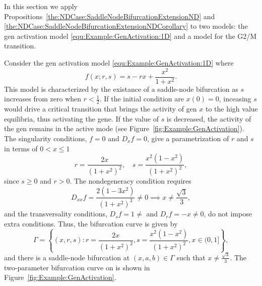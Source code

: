 \documentclass[12pt]{article}
\begin{document}
In this section we apply Propositions~\ref{the:NDCase:SaddleNodeBifurcationExtensionND} and \ref{the:NDCase:SaddleNodeBifurcationExtensionNDCorollary} to two models: the gen activation model \eqref{equ:Example:GenActivation:1D} and a model for the G2/M transition.


Consider the gen activation model \eqref{equ:Example:GenActivation:1D} where 
\[f(x;r,s)=s-rx+\frac{x^{2}}{1+x^{2}}.\]
This model is characterized by the existance of a saddle-node bifurcation as $s$ increases from zero when $r<\tfrac{1}{2}$. If the initial condition are $x(0)=0$, inceasing $s$ would drive a critical transition that brings the activity of gen $x$ to the high value equilibria, thus activating the gene. If the value of $s$ is decreased, the activity of the gen remains in the active mode (see Figure~\ref{fig:Example:GenActivation}).
The singularity conditions, $f=0$ and $D_{x}f=0$, give a parametrization of $r$ and $s$ in terms of $0< x\leq 1$
\[
r=\frac{2x}{(1+x^{2})^{2}}, \quad s = \frac{x^{2}(1-x^{2})}{(1+x^{2})^{2}},
\]
since $s\geq0$ and $r>0$. The nondegeneracy condition requires
\[
D_{xx}f = \frac{2(1-3x^{2})}{(1+x^{2})^{3}}\neq 0 \implies x\neq \frac{\sqrt{3}}{3},
\]
and the transversality conditions, $D_{s}f=1\neq$ and $D_{r}f=-x\neq 0 $, do not impose extra conditions. Thus, the bifurcation curve is given by
\begin{equation}
    \Gamma = \left\{ (x,r,s) : r=\frac{2x}{(1+x^{2})^{2}}, s = \frac{x^{2}(1-x^{2})}{(1+x^{2})^{2}}, x\in (0,1]\right\},
    \label{equ:Example:GenActivation:Gamma}
\end{equation}
and there is a saddle-node bifurcation at $(x,a,b)\in\Gamma$ such that $x\neq\frac{\sqrt{3}}{3}$. The two-parameter bifurcation curve on is shown in Figure~\ref{fig:Example:GenActivation}.
\end{document}
